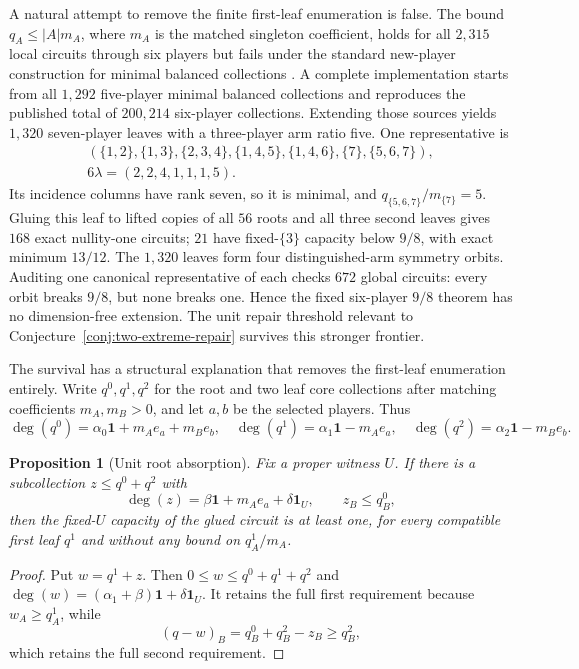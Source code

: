 \documentclass[11pt]{article}
\newtheorem{proposition}[theorem]{Proposition}
\begin{document}
A natural attempt to remove the finite first-leaf enumeration is false.
The bound $q_A\leq |A|m_A$, where $m_A$ is the matched singleton
coefficient, holds for all $2{,}315$ local circuits through six players but
fails under the standard new-player construction for minimal balanced
collections \citep{LaplaceMermoud2025}.  A complete implementation starts
from all $1{,}292$ five-player minimal balanced collections and reproduces
the published total of $200{,}214$ six-player collections.  Extending those
sources yields $1{,}320$ seven-player leaves with a three-player arm ratio
five.  One representative is
\[
\begin{gathered}
(\{1,2\},\{1,3\},\{2,3,4\},\{1,4,5\},\{1,4,6\},
  \{7\},\{5,6,7\}),\\
6\lambda=(2,2,4,1,1,1,5).
\end{gathered}
\]
Its incidence columns have rank seven, so it is minimal, and
$q_{\{5,6,7\}}/m_{\{7\}}=5$.  Gluing this leaf to lifted copies of all $56$
roots and all three second leaves gives $168$ exact nullity-one circuits;
$21$ have fixed-$\{3\}$ capacity below $9/8$, with exact minimum $13/12$.
The $1{,}320$ leaves form four distinguished-arm symmetry orbits.  Auditing
one canonical representative of each checks $672$ global circuits: every
orbit breaks $9/8$, but none breaks one.  Hence the fixed six-player $9/8$
theorem has no dimension-free extension.  The unit repair threshold relevant
to Conjecture~\ref{conj:two-extreme-repair} survives this stronger frontier.

The survival has a structural explanation that removes the first-leaf
enumeration entirely.  Write $q^0,q^1,q^2$ for the root and two leaf core
collections after matching coefficients $m_A,m_B>0$, and let $a,b$ be the
selected players.  Thus
\[
 \deg(q^0)=\alpha_0\mathbf1+m_Ae_a+m_Be_b,
 \quad \deg(q^1)=\alpha_1\mathbf1-m_Ae_a,
 \quad \deg(q^2)=\alpha_2\mathbf1-m_Be_b.
\]

\begin{proposition}[Unit root absorption]\label{prop:unit-root-absorption}
Fix a proper witness $U$.  If there is a subcollection $z\le q^0+q^2$ with
\[
 \deg(z)=\beta\mathbf1+m_Ae_a+\delta\mathbf1_U,
 \qquad z_B\le q^0_B,
\]
then the fixed-$U$ capacity of the glued circuit is at least one, for every
compatible first leaf $q^1$ and without any bound on $q^1_A/m_A$.
\end{proposition}

\begin{proof}
Put $w=q^1+z$.  Then $0\le w\le q^0+q^1+q^2$ and
$\deg(w)=(\alpha_1+\beta)\mathbf1+\delta\mathbf1_U$.  It retains the full
first requirement because $w_A\ge q^1_A$, while
\[
 (q-w)_B=q^0_B+q^2_B-z_B\ge q^2_B,
\]
which retains the full second requirement.
\end{proof}
\end{document}
